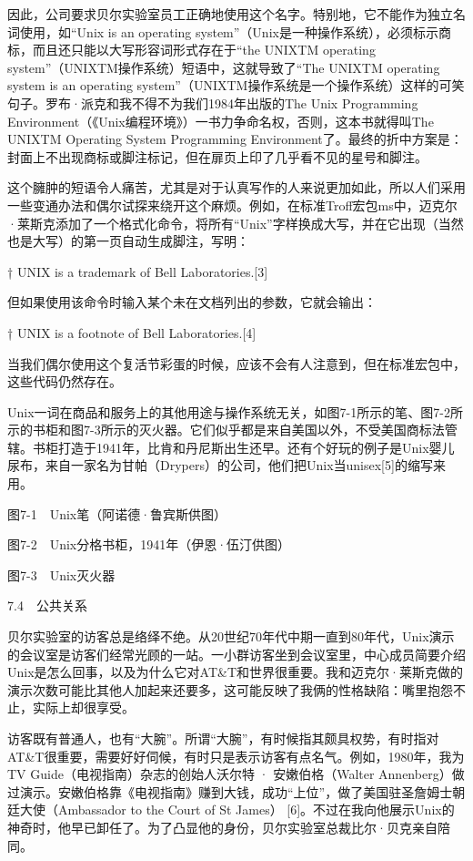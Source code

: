 \documentclass[a4paper,12pt,UTF8,twoside]{ctexbook}
\begin{document}
因此，公司要求贝尔实验室员工正确地使用这个名字。特别地，它不能作为独立名词使用，如“Unix is an operating system”（Unix是一种操作系统），必须标示商标，而且还只能以大写形容词形式存在于“the UNIXTM operating system”（UNIXTM操作系统）短语中，这就导致了“The UNIXTM operating system is an operating system”（UNIXTM操作系统是一个操作系统）这样的可笑句子。罗布·派克和我不得不为我们1984年出版的The Unix Programming Environment（《Unix编程环境》）一书力争命名权，否则，这本书就得叫The UNIXTM Operating System Programming Environment了。最终的折中方案是：封面上不出现商标或脚注标记，但在扉页上印了几乎看不见的星号和脚注。

这个臃肿的短语令人痛苦，尤其是对于认真写作的人来说更加如此，所以人们采用一些变通办法和偶尔试探来绕开这个麻烦。例如，在标准Troff宏包ms中，迈克尔·莱斯克添加了一个格式化命令，将所有“Unix”字样换成大写，并在它出现（当然也是大写）的第一页自动生成脚注，写明：

† UNIX is a trademark of Bell Laboratories.[3]

但如果使用该命令时输入某个未在文档列出的参数，它就会输出：

† UNIX is a footnote of Bell Laboratories.[4]

当我们偶尔使用这个复活节彩蛋的时候，应该不会有人注意到，但在标准宏包中，这些代码仍然存在。

Unix一词在商品和服务上的其他用途与操作系统无关，如图7-1所示的笔、图7-2所示的书柜和图7-3所示的灭火器。它们似乎都是来自美国以外，不受美国商标法管辖。书柜打造于1941年，比肯和丹尼斯出生还早。还有个好玩的例子是Unix婴儿尿布，来自一家名为甘帕（Drypers）的公司，他们把Unix当unisex[5]的缩写来用。



图7-1　Unix笔（阿诺德·鲁宾斯供图）



图7-2　Unix分格书柜，1941年（伊恩·伍汀供图）



图7-3　Unix灭火器





7.4　公共关系


贝尔实验室的访客总是络绎不绝。从20世纪70年代中期一直到80年代，Unix演示的会议室是访客们经常光顾的一站。一小群访客坐到会议室里，中心成员简要介绍Unix是怎么回事，以及为什么它对AT\&T和世界很重要。我和迈克尔·莱斯克做的演示次数可能比其他人加起来还要多，这可能反映了我俩的性格缺陷：嘴里抱怨不止，实际上却很享受。

访客既有普通人，也有“大腕”。所谓“大腕”，有时候指其颇具权势，有时指对AT\&T很重要，需要好好伺候，有时只是表示访客有点名气。例如，1980年，我为TV Guide（电视指南）杂志的创始人沃尔特 · 安嫩伯格（Walter Annenberg）做过演示。安嫩伯格靠《电视指南》赚到大钱，成功“上位”，做了美国驻圣詹姆士朝廷大使（Ambassador to the Court of St James） [6]。不过在我向他展示Unix的神奇时，他早已卸任了。为了凸显他的身份，贝尔实验室总裁比尔·贝克亲自陪同。
\end{document}
